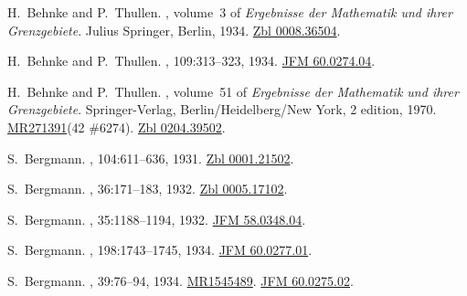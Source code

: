 \documentclass[11pt,a4paper, final, twoside]{article}
\numberwithin{equation}{section}
\begin{document}
\begin{appendices}
\begin{thebibliography}{100}
H.~{Behnke} and P.~{Thullen}.
,
  volume~3 of {\em {Ergebnisse der Mathematik und ihrer Grenzgebiete}}.
\newblock Julius Springer, Berlin, 1934.
\newblock \href{http://zbmath.org/?q=an:0008.36504}{Zbl 0008.36504}.

H.~{Behnke} and P.~{Thullen}.
, 109:313--323, 1934.
\newblock \href{http://zbmath.org/?q=an:60.0274.04}{JFM 60.0274.04}.

H.~Behnke and P.~Thullen.
,
  volume~51 of {\em {Ergebnisse der Mathematik und ihrer Grenzgebiete}}.
\newblock Springer-Verlag, Berlin/Heidelberg/New York, 2 edition, 1970.
\newblock \href{http://www.ams.org/mathscinet-getitem?mr=271391}{MR271391}(42
  \#6274). \href{http://zbmath.org/?q=an:0204.39502}{Zbl 0204.39502}.

S.~Bergmann.
, 104:611--636, 1931.
\newblock \href{http://zbmath.org/?q=an:0001.21502}{Zbl 0001.21502}.

S.~Bergmann.
, 36:171--183, 1932.
\newblock \href{http://zbmath.org/?q=an:0005.17102}{Zbl 0005.17102}.

S.~Bergmann.
,
  35:1188--1194, 1932.
\newblock \href{http://zbmath.org/?q=an:58.0348.04}{JFM 58.0348.04}.

S.~Bergmann.
, 198:1743--1745, 1934.
\newblock \href{http://zbmath.org/?q=an:60.0277.01}{JFM 60.0277.01}.

S.~Bergmann.
, 39:76--94, 1934.
\newblock \href{http://www.ams.org/mathscinet-getitem?mr=1545489}{MR1545489}.
  \href{http://zbmath.org/?q=an:60.0275.02}{JFM 60.0275.02}.


\end{thebibliography}
\end{appendices}
\end{document}
